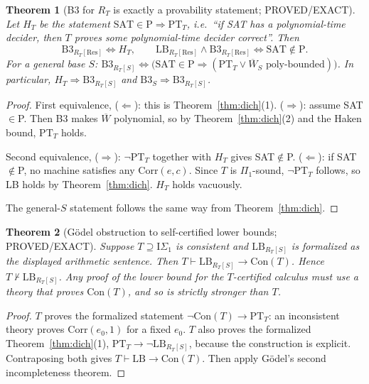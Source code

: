 \documentclass[11pt]{article}
\newtheorem{theorem}{Theorem}
\newcommand{\Wb}{\overline W}
\newcommand{\Corr}{\mathrm{Corr}}
\newcommand{\PT}{\mathrm{PT}}
\begin{document}
\begin{theorem}[B3 for $R_T$ is exactly a provability statement; PROVED/EXACT]\label{thm:b3}
Let $H_T$ be the statement $\mathrm{SAT}\in\mathrm P\Rightarrow\PT_T$, i.e.\ ``if SAT has a
polynomial-time decider, then $T$ proves some polynomial-time decider correct''. Then
\[
\mathrm{B3}_{R_T[\mathrm{Res}]}\iff H_T,
\qquad
\mathrm{LB}_{R_T[\mathrm{Res}]}\wedge \mathrm{B3}_{R_T[\mathrm{Res}]}\iff \mathrm{SAT}\notin\mathrm P .
\]
For a general base $S$: $\mathrm{B3}_{R_T[S]}\iff\big(\mathrm{SAT}\in\mathrm P\Rightarrow(\PT_T\vee\Wb_S\text{ poly-bounded})\big)$.
In particular, $H_T\Rightarrow\mathrm{B3}_{R_T[S]}$ and $\mathrm{B3}_S\Rightarrow\mathrm{B3}_{R_T[S]}$.
\end{theorem}
\begin{proof}
First equivalence, ($\Leftarrow$): this is Theorem~\ref{thm:dich}(1). ($\Rightarrow$):
assume SAT$\in$P. Then B3 makes $\Wb$ polynomial, so by Theorem~\ref{thm:dich}(2) and the
Haken bound, $\PT_T$ holds.

Second equivalence, ($\Rightarrow$): $\neg\PT_T$ together with $H_T$ gives SAT$\notin$P.
($\Leftarrow$): if SAT$\notin$P, no machine satisfies any $\Corr(e,c)$. Since $T$ is
$\Pi_1$-sound, $\neg\PT_T$ follows, so LB holds by Theorem~\ref{thm:dich}. $H_T$ holds
vacuously.

The general-$S$ statement follows the same way from Theorem~\ref{thm:dich}.
\end{proof}

\begin{theorem}[G\"odel obstruction to self-certified lower bounds; PROVED/EXACT]\label{thm:godel}
Suppose $T\supseteq\mathrm{I}\Sigma_1$ is consistent and $\mathrm{LB}_{R_T[S]}$ is
formalized as the displayed arithmetic sentence. Then $T\vdash \mathrm{LB}_{R_T[S]}\to\mathrm{Con}(T)$.
Hence $T\nvdash\mathrm{LB}_{R_T[S]}$. Any proof of the lower bound for the $T$-certified
calculus must use a theory that proves $\mathrm{Con}(T)$, and so is strictly stronger than $T$.
\end{theorem}
\begin{proof}
$T$ proves the formalized statement $\neg\mathrm{Con}(T)\to \PT_T$: an inconsistent theory
proves $\Corr(e_0,1)$ for a fixed $e_0$. $T$ also proves the formalized
Theorem~\ref{thm:dich}(1), $\PT_T\to\neg\mathrm{LB}_{R_T[S]}$, because the construction is
explicit. Contraposing both gives $T\vdash\mathrm{LB}\to\mathrm{Con}(T)$. Then apply
G\"odel's second incompleteness theorem.
\end{proof}
\end{document}
